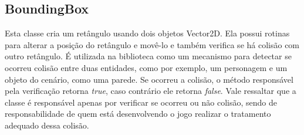 \subsection{BoundingBox}
%
%
Esta classe cria um retângulo usando dois objetos Vector2D. Ela possui rotinas para alterar a posição do retângulo e movê-lo e também verifica se há colisão com outro retângulo. É utilizada na biblioteca como um mecanismo para detectar se ocorreu colisão entre duas entidades, como por exemplo, um personagem e um objeto do cenário, como uma parede. Se ocorreu a colisão, o método responsável pela verificação retorna \textit{true}, caso contrário ele retorna \textit{false}. Vale ressaltar que a classe é responsável apenas por verificar se ocorreu ou não colisão, sendo de responsabilidade de quem está desenvolvendo o jogo realizar o tratamento adequado dessa colisão.
%
%
